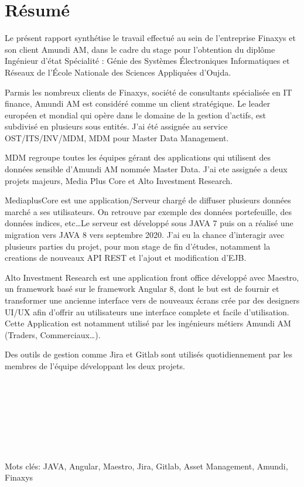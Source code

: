 \chapter*{Résumé}
\par Le présent rapport synthétise le travail effectué au sein de l'entreprise Finaxys et son client Amundi AM, dans le cadre du stage pour l’obtention du diplôme Ingénieur d'état Spécialité : Génie des Systèmes Électroniques Informatiques et Réseaux de l'École Nationale des Sciences Appliquées d'Oujda.  \\
\par Parmis les nombreux clients de Finaxys, société de consultants spécialisée en IT finance, Amundi AM est considéré comme un client stratégique. Le leader européen et mondial qui opère dans le domaine de la gestion d'actifs, est subdivisé en plusieurs sous entités. J'ai été assignée au service OST/ITS/INV/MDM, MDM pour Master Data Management. \\
\par MDM regroupe toutes les équipes gérant des applications qui utilisent des données sensible d'Amundi AM nommée Master Data. J'ai ete assignée a deux projets majeurs, Media Plus Core et Alto Investment Research. \\
\par MediaplusCore est une application/Serveur chargé de diffuser plusieurs données marché a ses utilisateurs. On retrouve par exemple des données portefeuille, des données indices, etc\dots Le serveur est développé sous JAVA 7 puis on a réalisé une migration vers JAVA 8 vers septembre 2020. J'ai eu la chance d'interagir avec plusieurs parties du projet, pour mon stage de fin d'études, notamment la creations de nouveaux API REST et l'ajout et modification d'EJB. \\
\par Alto Investment Research est une application front office développé avec Maestro, un framework basé sur le framework Angular 8, dont le but est de fournir et transformer une ancienne interface vers de nouveaux écrans crée par des designers UI/UX afin d'offrir au utilisateurs une interface complete et facile d'utilisation. Cette Application est notamment utilisé par les ingénieurs métiers Amundi AM (Traders, Commerciaux\dots). \\
\par Des outils de gestion comme Jira et Gitlab sont utilisés quotidiennement par les membres de l’équipe développant les deux projets.
\\~\\~\\~\\~\\~\\~\\~\\
\par Mots clés: JAVA, Angular, Maestro, Jira, Gitlab, Asset Management, Amundi, Finaxys